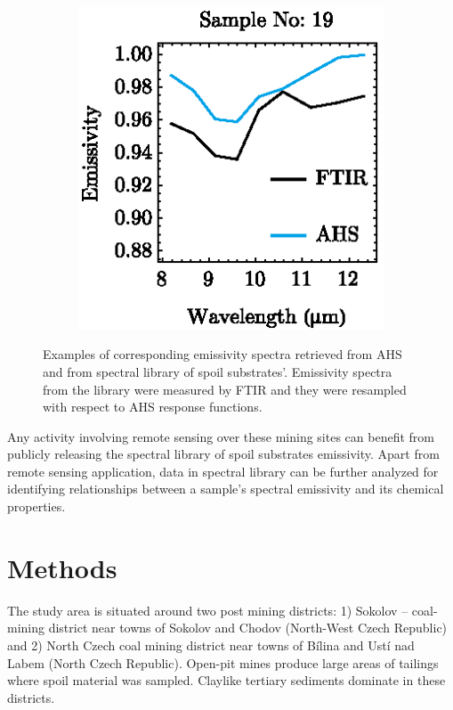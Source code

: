 \begin{appendices}
\begin{figure}[!t]
\begin{subfigure}[t]{.3\linewidth}
		\includegraphics[scale=1]{pics/Chapter_05/Sample_no_19.eps}
		\caption{}
	\end{subfigure}
	\vspace{1.5 em}
	\caption{Examples of corresponding emissivity spectra retrieved from AHS and from spectral library of spoil substrates’. Emissivity spectra from the library were measured by FTIR and they were resampled with respect to AHS response functions. }
	\label{fig:AHSvsFTIRcomparison}
\end{figure}

Any activity involving remote sensing over these mining sites can benefit from publicly releasing the spectral library of spoil substrates emissivity. Apart from remote sensing application, data in spectral library can be further analyzed for identifying relationships between a sample’s spectral emissivity and its chemical properties.

\section{Methods}

The study area is situated around two post mining districts: 1) Sokolov – coal-mining district near towns of Sokolov and Chodov (North-West Czech Republic) and 2) North Czech coal mining district near towns of Bílina and Ustí nad Labem (North Czech Republic). Open-pit mines produce large areas of tailings where spoil material was sampled. Claylike tertiary sediments dominate in these districts.


\end{appendices}
